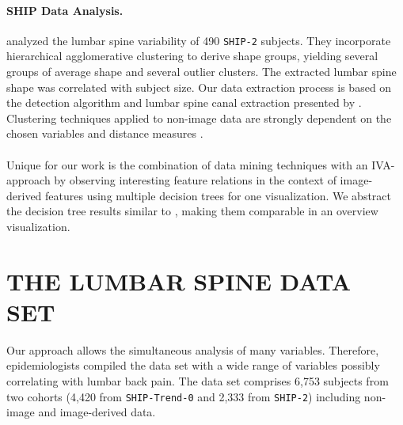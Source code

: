 \documentclass[a4paper,twoside]{style/article}
\begin{document}
\paragraph{SHIP Data Analysis.}
\cite{Klemm2013VMV} analyzed the lumbar spine variability of 490 \texttt{SHIP-2} subjects.
They incorporate hierarchical agglomerative clustering to derive shape groups, yielding several groups of average shape and several outlier clusters.
The extracted lumbar spine shape was correlated with subject size.
Our data extraction process is based on the detection algorithm and lumbar spine canal extraction presented by \cite{Klemm2013VMV}.
Clustering techniques applied to non-image data are strongly dependent on the chosen variables and distance measures \cite{Klemm2014BVM}.
\\\\
Unique for our work is the combination of data mining techniques with an IVA-approach by observing interesting feature relations in the context of image-derived features using multiple decision trees for one visualization.
We abstract the decision tree results similar to \cite{Turkay}, making them comparable in an overview visualization.
\section{\uppercase{The Lumbar Spine Data Set}}
\label{sec:MaterialsAndMethod}
\noindent Our approach allows the simultaneous analysis of many variables.
Therefore, epidemiologists compiled the data set with a wide range of variables possibly correlating with lumbar back pain.
The data set comprises 6,753 subjects from two cohorts (4,420 from \texttt{SHIP-Trend-0} and 2,333 from \texttt{SHIP-2}) including non-image and image-derived data.

\end{document}
